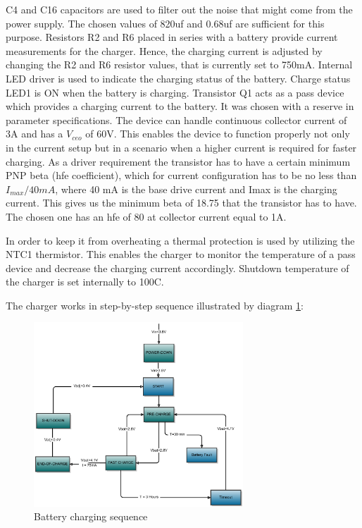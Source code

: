 C4 and C16 capacitors are used to filter out the noise that might come from the power supply. The chosen values of 820uf and 0.68uf are sufficient for this purpose. Resistors R2 and R6 placed in series with a battery provide current measurements for the charger. Hence, the charging current is adjusted by changing the R2 and R6 resistor values, that is currently set to 750mA. Internal LED driver is used to indicate the charging status of the battery. Charge status LED1 is ON when the battery is charging. Transistor Q1 acts as a pass device which provides a charging current to the battery. It was chosen with a reserve in parameter specifications. The device can handle continuous collector current of 3A and has a $V_{ceo}$ of 60V. This enables the device to function properly not only in the current setup but in a scenario when a higher current is required for faster charging. As a driver requirement the transistor has to have a certain minimum PNP beta (hfe coefficient), which for current configuration has to be no less than $I_{max} / 40mA $, where 40 mA is the base drive current and Imax is the charging current. This gives us the minimum beta of 18.75 that the transistor has to have. The chosen one has an hfe of 80 at collector current equal to 1A. 

In order to keep it from overheating a thermal protection is used by utilizing the NTC1 thermistor. This enables the charger to monitor the temperature of a pass device and decrease the charging current accordingly. Shutdown temperature of the charger is set internally to 100C. 

The charger works in step-by-step sequence illustrated by diagram \ref{fig:charger_sequence}:

\begin{figure}
\centering
\includegraphics[width=0.7\textwidth]{Images/battery_charging}
\caption{Battery charging sequence}
\label{fig:charger_sequence}
\end{figure}

